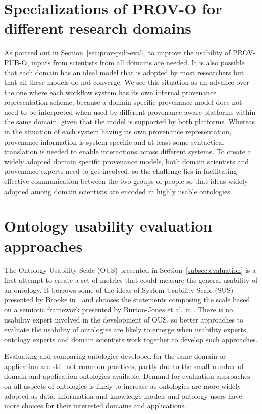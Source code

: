 \section{Specializations of PROV-O for different research domains}
As pointed out in Section~\ref{sec:prov-pub-eval}, to improve the usability of PROV-PUB-O, inputs from scientists from all domains are needed. It is also possible that each domain has an ideal model that is adopted by most researchers but that all these models do not converge. We see this situation as an advance over the one where each workflow system has its own internal provenance representation scheme, because a domain specific provenance model does not need to be interpreted when used by different provenance aware platforms within the same domain, given that the model is supported by both platforms. Whereas in the situation of each system having its own provenance representation, provenance information is system specific and at least some syntactical translation is needed to enable interactions across different systems. To create a widely adopted domain specific provenance models, both domain scientists and provenance experts need to get involved, so the challenge lies in facilitating effective communication between the two groups of people so that ideas widely adopted among domain scientists are encoded in highly usable ontologies.

\section{Ontology usability evaluation approaches}
The Ontology Usability Scale (OUS) presented in Section~\ref{subsec:evaluation} is a first attempt to create a set of metrics that could measure the general usability of an ontology. It borrows some of the ideas of System Usability Scale (SUS) presented by Brooke in \cite{brooke1996sus}, and chooses the statements composing the scale based on a semiotic framework presented by Burton-Jones et al. in \cite{burton2005semiotic}. There is no usability expert involved in the development of OUS, so better approaches to evaluate the usability of ontologies are likely to emerge when usability experts, ontology experts and domain scientists work together to develop such approaches.

Evaluating and comparing ontologies developed for the same domain or application are still not common practices, partly due to the small number of domain and application ontologies available. Demand for evaluation approaches on all aspects of ontologies is likely to increase as ontologies are more widely adopted as data, information and knowledge models and ontology users have more choices for their interested domains and applications.

